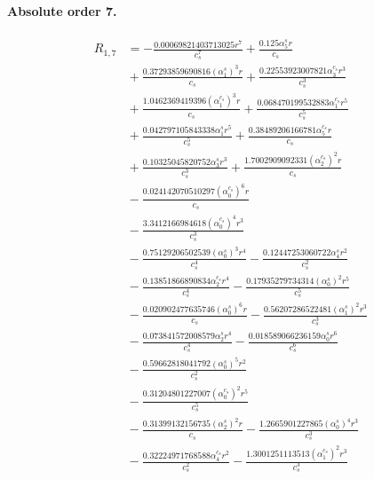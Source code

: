 \documentclass[10pt]{article}
\begin{document}
\paragraph{Absolute order 7.}
\begin{align*}
R_{1,7} &=  - \frac{0.00069821403713025 r^{7}}{c_{s}^{7}} + \frac{0.125 \alpha_{5}^s r}{c_{s}} \\
&{}  + \frac{0.37293859690816 \left(\alpha_{1}^s\right)^{3} r}{c_{s}} + \frac{0.22553923007821 \alpha_{3}^{c_s} r^{3}}{c_{s}^{3}} \\
&{}  + \frac{1.0462369419396 \left(\alpha_{1}^{c_s}\right)^{3} r}{c_{s}} + \frac{0.068470199532883 \alpha_{1}^{c_s} r^{5}}{c_{s}^{5}} \\
&{}  + \frac{0.042797105843338 \alpha_{1}^s r^{5}}{c_{s}^{5}} + \frac{0.38489206166781 \alpha_{5}^{c_s} r}{c_{s}} \\
&{}  + \frac{0.10325045820752 \alpha_{3}^s r^{3}}{c_{s}^{3}} + \frac{1.7002909092331 \left(\alpha_{2}^{c_s}\right)^{2} r}{c_{s}} \\
&{}  - \frac{0.024142070510297 \left(\alpha_{0}^{c_s}\right)^{6} r}{c_{s}} \\
&{}  - \frac{3.3412166984618 \left(\alpha_{0}^{c_s}\right)^{4} r^{3}}{c_{s}^{3}} \\
&{}  - \frac{0.75129206502539 \left(\alpha_{0}^s\right)^{3} r^{4}}{c_{s}^{4}} - \frac{0.12447253060722 \alpha_{4}^s r^{2}}{c_{s}^{2}} \\
&{}  - \frac{0.13851866890834 \alpha_{2}^{c_s} r^{4}}{c_{s}^{4}} - \frac{0.17935279734314 \left(\alpha_{0}^s\right)^{2} r^{5}}{c_{s}^{5}} \\
&{}  - \frac{0.020902477635746 \left(\alpha_{0}^s\right)^{6} r}{c_{s}} - \frac{0.56207286522481 \left(\alpha_{1}^s\right)^{2} r^{3}}{c_{s}^{3}} \\
&{}  - \frac{0.073841572008579 \alpha_{2}^s r^{4}}{c_{s}^{4}} - \frac{0.018589066236159 \alpha_{0}^s r^{6}}{c_{s}^{6}} \\
&{}  - \frac{0.59662818041792 \left(\alpha_{0}^s\right)^{5} r^{2}}{c_{s}^{2}} \\
&{}  - \frac{0.31204801227007 \left(\alpha_{0}^{c_s}\right)^{2} r^{5}}{c_{s}^{5}} \\
&{}  - \frac{0.31399132156735 \left(\alpha_{2}^s\right)^{2} r}{c_{s}} - \frac{1.2665901227865 \left(\alpha_{0}^s\right)^{4} r^{3}}{c_{s}^{3}} \\
&{}  - \frac{0.32224971768588 \alpha_{4}^{c_s} r^{2}}{c_{s}^{2}} - \frac{1.3001251113513 \left(\alpha_{1}^{c_s}\right)^{2} r^{3}}{c_{s}^{3}} \\

\end{align*}
\end{document}
